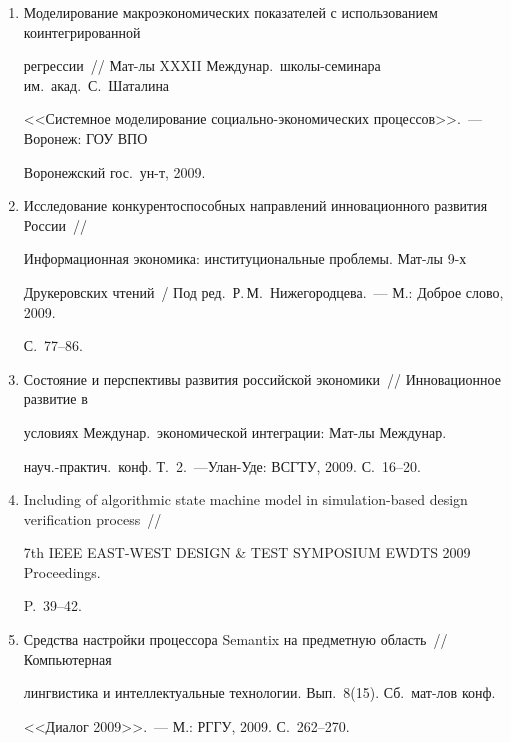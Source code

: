 \begin{enumerate}[1.]
\item {}


Моделирование макроэкономических показателей с использованием коинтегрированной 


регрессии~// Мат-лы XXXII Междунар.\ шко\-лы-се\-ми\-на\-ра им.~акад.\ С.~Шаталина 


<<Системное моделирование со\-ци\-аль\-но-эко\-но\-ми\-че\-ских процессов>>.~--- Воронеж: ГОУ ВПО 


Воронежский гос.\ ун-т, 2009.





\item {}


Исследование конкурентоспособных на\-прав\-ле\-ний инновационного развития России~// 


Информационная экономика: институциональные проблемы. Мат-лы 9-х 


Друкеровских чтений~/ Под ред.\ Р.\,М.~Нижегородцева.~--- М.: Доброе слово, 2009. 


С.~77--86.





\item {}


Состояние и перспективы развития российской экономики~// Инновационное развитие в 


условиях Междунар.\ экономической интеграции: Мат-лы Междунар.\ 


науч.-практич.\ конф. Т.~2.~---Улан-Уде:  ВСГТУ, 2009. С.~16--20.





\item {}


Including of algorithmic state machine model in simulation-based design verification process~// 


7th IEEE EAST-WEST DESIGN \& TEST SYMPOSIUM EWDTS 2009 Proceedings. 


P.~39--42. 





\item {}


Средства настройки процессора Semantix на предметную область~//  Компьютерная 


лингвистика и интеллектуальные технологии. Вып.~8(15). Сб.\ мат-лов конф. 


<<Диалог 2009>>.~--- М.: РГГУ, 2009. С.~262--270. 


\end{enumerate}





